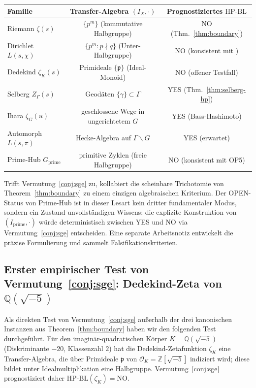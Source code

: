 \documentclass[11pt]{article}
\theoremstyle{definition}
\theoremstyle{remark}
\newcommand{\HBL}{\mathrm{HP\text{-}BL}}
\begin{document}
\begin{center}
\begin{tabular}{@{}lcc@{}}
\toprule
Familie & Transfer-Algebra $(I_X, \cdot)$ & Prognostiziertes $\HBL$ \\
\midrule
Riemann $\zeta(s)$ & $\{p^m\}$ (kommutative Halbgruppe) & NO (Thm.~\ref{thm:boundary}) \\
Dirichlet $L(s,\chi)$ & $\{p^m : p \nmid q\}$ (Unter-Halbgruppe) & NO (konsistent mit \cite{PaleyWienerDirichlet}) \\
Dedekind $\zeta_K(s)$ & Primideale $\{\mathfrak{p}\}$ (Ideal-Monoid) & NO (offener Testfall) \\
Selberg $Z_\Gamma(s)$ & Geodäten $\{\gamma\} \subset \Gamma$ & YES (Thm.~\ref{thm:selberg-hp}) \\
Ihara $\zeta_G(u)$ & geschlossene Wege in ungerichtetem $G$ & YES (Bass-Hashimoto) \\
Automorph $L(s,\pi)$ & Hecke-Algebra auf $\Gamma\backslash G$ & YES (erwartet) \\
Prime-Hub $G_\mathrm{prime}$ & primitive Zyklen (freie Halbgruppe) & NO (konsistent mit OP5) \\
\bottomrule
\end{tabular}
\end{center}

Trifft Vermutung~\ref{conj:sge} zu, kollabiert die scheinbare Trichotomie
von Theorem~\ref{thm:boundary} zu einem einzigen algebraischen Kriterium.
Der OPEN-Status von Prime-Hub ist in dieser Lesart kein dritter
fundamentaler Modus, sondern ein Zustand unvollständigen Wissens: die explizite
Konstruktion von $(I_\mathrm{prime}, \cdot)$ würde deterministisch zwischen
YES und NO via Vermutung~\ref{conj:sge} entscheiden. Eine separate
Arbeitsnotiz \cite{SGENote} entwickelt die präzise Formulierung und
sammelt Falsifikationskriterien.

\subsection[Erster empirischer Test von Vermutung: Dedekind-Zeta von Q(sqrt(-5))]{Erster empirischer Test von Vermutung~\ref{conj:sge}:
Dedekind-Zeta von \texorpdfstring{$\mathbb{Q}(\sqrt{-5})$}{Q(sqrt(-5))}}
\label{sec:sge-dedekind-test}

Als direkten Test von Vermutung~\ref{conj:sge} außerhalb der drei kanonischen
Instanzen aus Theorem~\ref{thm:boundary} haben wir den folgenden Test
\cite{DedekindNEBTest} durchgeführt. Für den imaginär-quadratischen Körper
$K = \mathbb{Q}(\sqrt{-5})$ (Diskriminante $-20$, Klassenzahl $2$) hat die
Dedekind-Zetafunktion $\zeta_K$ eine Transfer-Algebra, die über
Primideale $\mathfrak{p}$ von $\mathcal{O}_K = \mathbb{Z}[\sqrt{-5}]$ indiziert
wird; diese bildet unter Idealmultiplikation eine Halbgruppe.
Vermutung~\ref{conj:sge} prognostiziert daher $\HBL(\zeta_K) = \mathrm{NO}$.
\end{document}
